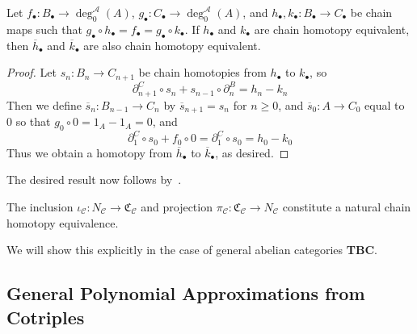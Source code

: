 \begin{prop}[label=prop:chainHomotopEquivOfAug]
    Let $f_\bullet:B_\bullet\to \deg_0^\mathcal{A}(A)$, $g_\bullet:C_\bullet\to \deg_0^\mathcal{A}(A)$, and $h_\bullet,k_\bullet:B_\bullet\to C_\bullet$ be chain maps such that $g_\bullet\circ h_\bullet = f_\bullet = g_\bullet\circ k_\bullet$. If $h_\bullet$ and $k_\bullet$ are chain homotopy equivalent, then $\overline{h}_\bullet$ and $\overline{k}_\bullet$ are also chain homotopy equivalent.
\end{prop}
\begin{proof}
    Let $s_n:B_n\to C_{n+1}$ be chain homotopies from $h_\bullet$ to $k_\bullet$, so 
    \begin{equation*}
        \partial_{n+1}^C \circ s_n+s_{n-1} \circ \partial_n^B = h_n-k_n
    \end{equation*}
    Then we define $\overline{s}_n:B_{n-1}\to C_n$ by $\overline{s}_{n+1} = s_n$ for $n \geq 0$, and $\overline{s}_0:A\to C_0$ equal to $0$ so that $g_0\circ 0 = 1_A-1_A = 0$, and 
    \begin{equation*}
        \partial_1^C\circ s_0 + f_0\circ 0 = \partial_1^C\circ s_0 = h_0-k_0
    \end{equation*}
    Thus we obtain a homotopy from $\overline{h}_\bullet$ to $\overline{k}_\bullet$, as desired.
\end{proof}

The desired result now follows by~\cite[Thm 2.5]{goerss-jardine}. 

\begin{lem}[label=lem:natChainHomotop]
    The inclusion $\iota_{\mathcal{C}}:N_\mathcal{C}\to \mathfrak{C}_\mathcal{C}$ and projection $\pi_{\mathcal{C}}:\mathfrak{C}_\mathcal{C}\to N_\mathcal{C}$ constitute a natural chain homotopy equivalence.
\end{lem}

We will show this explicitly in the case of general abelian categories \textbf{TBC}.



\subsection{General Polynomial Approximations from Cotriples}

